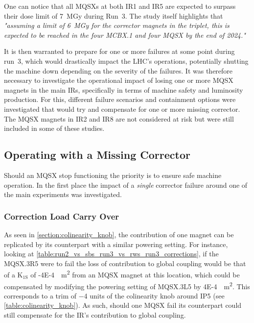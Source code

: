 One can notice that all MQSXs at both IR\num{1} and IR\num{5} are expected to surpass their dose limit of \qty{7}{\mega\gray} during Run~\num{3}.
The study itself highlights that \textit{"assuming a limit of \qty{6}{\mega\gray} for the corrector magnets in the triplet, this is expected to be reached in the four MCBX.1 and four MQSX by the end of 2024."}

It is then warranted to prepare for one or more failures at some point during \Gls{run}~\num{3}, which would drastically impact the LHC's operations, potentially shutting the machine down depending on the severity of the failures.
It was therefore necessary to investigate the operational impact of losing one or more MQSX magnets in the main IRs, specifically in terms of machine safety and luminosity production.
For this, different failure scenarios and containment options were investigated that would try and compensate for one or more missing corrector.
The MQSX magnets in IR\num{2} and IR\num{8} are not considered at risk but were still included in some of these studies.

\subsection{Operating with a Missing Corrector}

Should an MQSX stop functioning the priority is to ensure safe machine operation.
In the first place the impact of a \textit{single} corrector failure around one of the main experiments was investigated.

\subsubsection*{Correction Load Carry Over}

As seen in \cref{section:colinearity_knob}, the contribution of one magnet can be replicated by its counterpart with a similar powering setting.
For instance, looking at \cref{table:run2_vs_sbs_run3_vs_rws_run3_corrections}, if the MQSX.\num{3}R\num{5} were to fail the loss of contribution to global coupling would be that of a \(\mathrm{K_{1S}}\) of \qty{-4E-4}{\per\square\meter} from an MQSX magnet at this location, which could be compensated by modifying the powering setting of MQSX.\num{3}L\num{5} by \qty{4E-4}{\per\square\meter}.
This corresponds to a trim of \num{-4} units of the colinearity knob around IP\num{5} (see \cref{table:colinearity_knob}).
As such, should one MQSX fail its counterpart could still compensate for the \acrshort{IR}'s contribution to global coupling.


